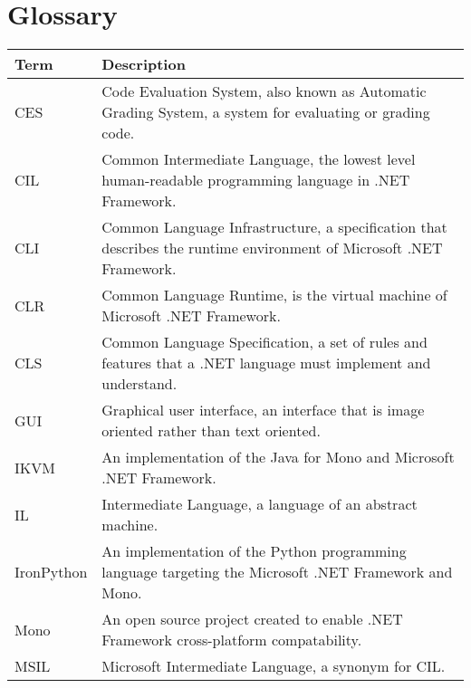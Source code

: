 \chapter*{Glossary}

\begin{center}
	\begin{tabular} { m{3cm} | m{11cm} }
		\hline
		\textbf{Term}	& \textbf{Description} \\ \hline
		CES				& Code Evaluation System, also known as Automatic Grading System, a system for evaluating or grading code. \\ \hline
		CIL				& Common Intermediate Language, the lowest level human-readable programming language in .NET Framework. \\ \hline
		CLI				& Common Language Infrastructure, a specification that describes the runtime environment of Microsoft .NET Framework. \\ \hline
		CLR				& Common Language Runtime, is the virtual machine of Microsoft .NET Framework. \\ \hline
		CLS				& Common Language Specification, a set of rules and features that a .NET language must implement and understand. \\ \hline
		GUI				& Graphical user interface, an interface that is image oriented rather than text oriented. \\ \hline
		IKVM			& An implementation of the Java for Mono and Microsoft .NET Framework. \\ \hline
		IL				& Intermediate Language, a language of an abstract machine. \\ \hline
		IronPython		& An implementation of the Python programming language targeting the Microsoft .NET Framework and Mono. \\ \hline
		Mono			& An open source project created to enable .NET Framework cross-platform compatability. \\ \hline
		MSIL			& Microsoft Intermediate Language, a synonym for CIL. \\ \hline
	\end{tabular}
\end{center}

